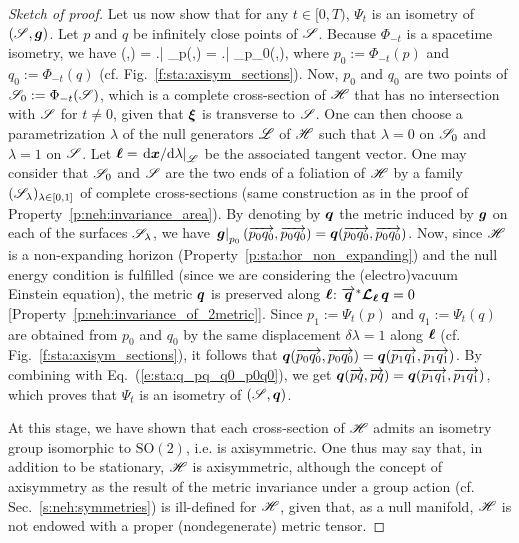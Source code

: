 \begin{proof}[Sketch of proof]
Let us now show that for any $t\in[0,T)$, %
$\Psi_t$ is an isometry of $(\mathscr{S},\bm{g})$.
Let $p$ and $q$ be infinitely close points of $\mathscr{S}$. Because $\Phi_{-t}$ is
a spacetime isometry, we have
\be \label{e:sta:q_pq_q0_p0q0}
 (,) = \left.\right| _p(,)
= \left.\right| _{p_0}(,),
\ee
where $p_0 := \Phi_{-t}(p)$ and $q_0 := \Phi_{-t}(q)$ (cf. Fig.~\ref{f:sta:axisym_sections}).
Now, $p_0$ and $q_0$ are two points of $\mathscr{S}_0 := \Phi_{-t}(\mathscr{S})$, which
is a complete cross-section of $\mathscr{H}$ that has no intersection with $\mathscr{S}$ for $t\neq 0$, given that $\bm{\xi}$ is transverse to $\mathscr{S}$. One can then
choose a parametrization $\lambda$ of the null generators $\mathscr{L}$ of $\mathscr{H}$
such that $\lambda=0$ on $\mathscr{S}_0$ and $\lambda=1$ on $\mathscr{S}$. Let
$\bm{\ell} = \left. \mathrm{d}\bm{x}/\mathrm{d}\lambda \right| _{\mathscr{L}}$ be the associated tangent vector.
One may consider that $\mathscr{S}_0$ and $\mathscr{S}$ are the two ends of a foliation of $\mathscr{H}$
by a family $(\mathscr{S}_\lambda)_{\lambda\in[0,1]}$ of complete cross-sections
(same construction as in the proof of Property~\ref{p:neh:invariance_area}).
By denoting by $\bm{q}$ the metric induced by $\bm{g}$ on each of the surfaces
$\mathscr{S}_\lambda$, we have $\left.\bm{g}\right| _{p_0}(\overrightarrow{p_0q_0},\overrightarrow{p_0q_0}) = \bm{q}(\overrightarrow{p_0q_0},\overrightarrow{p_0q_0})$. Now, since $\mathscr{H}$ is a non-expanding horizon (Property~\ref{p:sta:hor_non_expanding}) and the null
energy condition is fulfilled (since we are considering the (electro)vacuum Einstein equation), the metric $\bm{q}$ is preserved along
$\bm{\ell}$: $\overrightarrow{\bm{q}}^* \bm{\mathcal{L}}_{\bm{\ell}}\, \bm{q} = 0$ [Property~\ref{p:neh:invariance_of_2metric}]. Since $p_1:= \Psi_t(p)$ and $q_1:=\Psi_t(q)$
are obtained from $p_0$ and $q_0$ by the same displacement $\delta\lambda=1$
along $\bm{\ell}$ (cf. Fig.~\ref{f:sta:axisym_sections}),
it follows that $\bm{q}(\overrightarrow{p_0q_0},\overrightarrow{p_0q_0}) =  \bm{q}(\overrightarrow{p_1 q_1},\overrightarrow{p_1 q_1})$.
By combining with Eq.~(\ref{e:sta:q_pq_q0_p0q0}), we get
$\bm{q}(\overrightarrow{pq},\overrightarrow{pq}) = \bm{q}(\overrightarrow{p_1q_1},\overrightarrow{p_1q_1})$, which proves that
$\Psi_t$ is an isometry of $(\mathscr{S}, \bm{q})$.

At this stage, we have shown that each cross-section of $\mathscr{H}$ admits an
isometry group isomorphic to $\mathrm{SO}(2)$, i.e. is axisymmetric.
One thus may say that, in addition to be stationary,
$\mathscr{H}$ is axisymmetric, although the concept of axisymmetry as the result of the
metric invariance under a group action (cf. Sec.~\ref{s:neh:symmetries})
is ill-defined for $\mathscr{H}$, given that, as a null manifold, $\mathscr{H}$
is not endowed with a proper (nondegenerate) metric tensor.


\end{proof}

